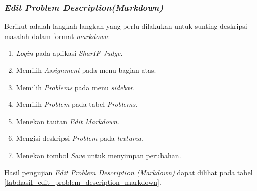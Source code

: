 \subsubsection{\textit{Edit Problem Description(Markdown)}}
\label{subsubsec:skenario_edit_problem_description_markdown}
Berikut adalah langkah-langkah yang perlu dilakukan untuk sunting deskripsi masalah dalam format \textit{markdown}:

\begin{enumerate}
	\item \textit{Login} pada aplikasi \textit{SharIF Judge}.
	\item Memilih \textit{Assignment} pada menu bagian atas.
	\item Memilih \textit{Problems} pada menu \textit{sidebar}.
	\item Memilih \textit{Problem} pada tabel \textit{Problems}.
	\item Menekan tautan \textit{Edit Markdown}.
	\item Mengisi deskripsi \textit{Problem} pada \textit{textarea}.
	\item Menekan tombol \textit{Save} untuk menyimpan perubahan.
\end{enumerate}

Hasil pengujian \textit{Edit Problem Description (Markdown)} dapat dilihat pada tabel \ref{tab:hasil_edit_problem_description_markdown}.

